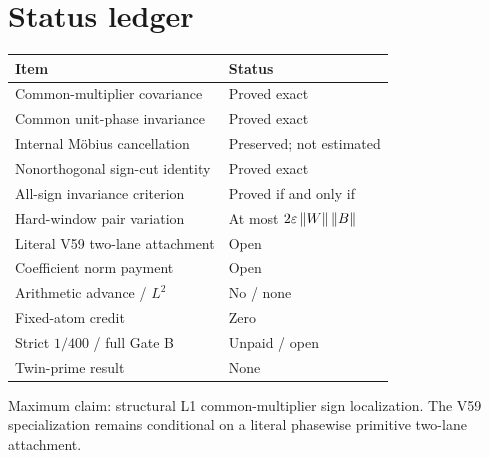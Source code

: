 \section{Status ledger}

\begingroup
\small
\begin{center}
\begin{tabularx}{\textwidth}{@{}lX@{}}
\toprule
Item & Status \\
\midrule
Common-multiplier covariance & Proved exact \\
Common unit-phase invariance & Proved exact \\
Internal M\"obius cancellation & Preserved; not estimated \\
Nonorthogonal sign-cut identity & Proved exact \\
All-sign invariance criterion & Proved if and only if \\
Hard-window pair variation & At most $2\varepsilon\left\lVert W\right\rVert\left\lVert B\right\rVert$ \\
Literal V59 two-lane attachment & Open \\
Coefficient norm payment & Open \\
Arithmetic advance / $L^2$ & No / none \\
Fixed-atom credit & Zero \\
Strict $1/400$ / full Gate B & Unpaid / open \\
Twin-prime result & None \\
\bottomrule
\end{tabularx}
\end{center}
\endgroup

\noindent\footnotesize
Maximum claim: structural L1 common-multiplier sign localization.  The V59
specialization remains conditional on a literal phasewise primitive two-lane
attachment.
